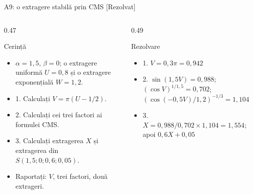 \begin{frame}{A9: o extragere stabilă prin CMS [Rezolvat]}
\itemsize{\footnotesize}
\begin{columns}[T]
\begin{column}{0.47\textwidth}
\begin{block}{Cerință}
\begin{itemize}
    \item $\alpha = 1{,}5$, $\beta = 0$; o extragere uniformă $U = 0{,}8$ și o extragere exponențială $W = 1{,}2$.
    \item 1. Calculați $V = \pi(U - 1/2)$.
    \item 2. Calculați cei trei factori ai formulei CMS.
    \item 3. Calculați extragerea $X$ și extragerea din $S(1{,}5; 0; 0{,}6; 0{,}05)$.
    \item Raportați: $V$, trei factori, două extrageri.
\end{itemize}
\end{block}
\end{column}
\begin{column}{0.49\textwidth}
\begin{exampleblock}{Rezolvare}
\begin{itemize}
    \item 1. $V = 0{,}3\pi = 0{,}942$
    \item 2. $\sin(1{,}5V) = 0{,}988$; $(\cos V)^{1/1{,}5} = 0{,}702$; $(\cos(-0{,}5V)/1{,}2)^{-1/3} = 1{,}104$
    \item 3. $X = 0{,}988/0{,}702 \times 1{,}104 = 1{,}554$; apoi $0{,}6X + 0{,}05$
\end{itemize}
\end{exampleblock}
\end{column}
\end{columns}
\end{frame}

